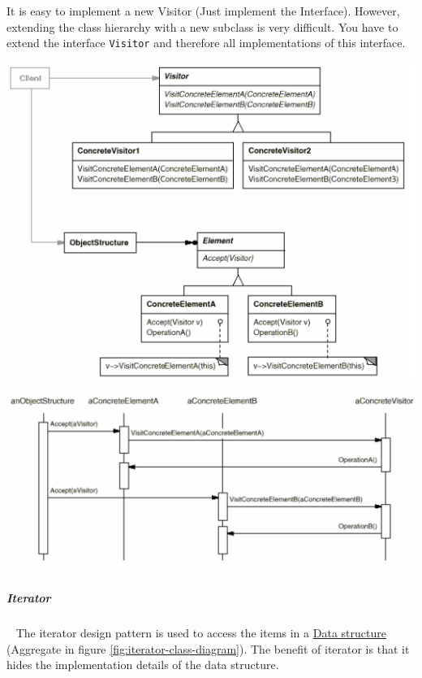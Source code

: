\documentclass[11pt,twoside,landscape]{article}
\begin{document}
\begin{multicols}{3}
It is easy to implement a new Visitor (Just implement the Interface).
However, extending the class hierarchy with a new subclass is very difficult.
You have to extend the interface \texttt{Visitor} and therefore all implementations of this interface.

{
\begin{center}
\includegraphics[width=.9\linewidth]{img/visitor.png}
\end{center}
\label{fig:visitor-class-diagram}
}

{
\begin{center}
\includegraphics[width=.9\linewidth]{img/visitor_sequence.png}
\end{center}
\label{fig:visitor-sequence}
}

\subparagraph{Iterator} \
\label{sec:org72faf05}
The iterator design pattern is used to access the items in a \href{../../../roam/20210518131131-datastructure.org}{Data structure} (Aggregate in figure \ref{fig:iterator-class-diagram}).
The benefit of iterator is that it hides the implementation details of the data structure.


\end{multicols}
\end{document}
